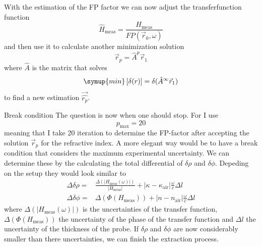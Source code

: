 \documentclass[aspectratio=1610, 9pt]{beamer}
\begin{document}
\begin{frame}
  With the estimation of the FP factor we can now adjust the transferfunction function 
  \begin{equation}
    \hat{H}_\text{meas} = \frac{H_\text{meas}}{FP(\vec{r}_0, \omega)}
  \end{equation}
  and then use it to calculate another minimization solution
  \begin{equation}
    \vec{r}_p = \hat{A}^p \vec{r}_1
  \end{equation}
  where $\hat{A}$ is the matrix that solves 
  \begin{equation}
    \symup{min} \left[ \delta(r)\right] = \delta(\hat{A}^\infty \vec{r}_1)
  \end{equation}
  to find a new estimation $\vec{\hat{r_p}}$.
\end{frame}

\begin{frame}{Break condition}
  The question is now when one should stop.
  For I use 
  \begin{equation}
    p_\text{max} = 20
  \end{equation}
  meaning that I take 20 iteration to determine the FP-factor after accepting the solution $\vec{r}_p$ for the refractive index.
  A more elegant way would be to have a break condition that considers the maximum experimental uncertainty.
  We can determine these by the calculating the total differential of $\delta \rho$ and $\delta \phi$.
  Depeding on the setup they would look similar to 
  \begin{align}
    \Delta \delta \rho =& \frac{\Delta(\left|H_\text{meas}(\omega)\right|)}{\left|H_\text{meas}\right|} + \left|\kappa - \kappa_\text{air}\right| \frac{\omega}{c} \Delta l \\
    \Delta \delta \phi =& \Delta(\Phi(H_\text{meas})) + \left| n - n_\text{air} \right| \frac{\omega}{c} \Delta l
  \end{align}
  where $\Delta(\left|H_\text{meas}(\omega)\right|)$ is the uncertainties of the transfer function, $\Delta(\Phi(H_\text{meas}))$ the uncertainty of the phase of the transfer function and $\Delta l$ the uncertainty of the thickness of the probe.
  If $\delta \rho$ and $\delta \phi$ are now considerably smaller than there uncertainties, we can finish the extraction process.
\end{frame}
\end{document}
